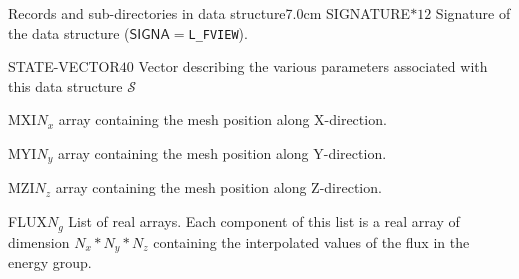 \begin{DescriptionEnregistrement}{Records and sub-directories
 in  data structure}{7.0cm}
\CharEnr
 {SIGNATURE}{$*12$}
 {Signature of the  data structure ($\mathsf{SIGNA}=${\tt L\_FVIEW}).}


\IntEnr
  {STATE-VECTOR}{$40$}
  {Vector describing the various parameters associated with this data structure
  $\mathcal{S}$}

\RealEnr
  {MXI}{$N_{x}$}{}
  {array containing the mesh position along X-direction.}

\RealEnr
  {MYI}{$N_{y}$}{}
  {array containing the mesh position along Y-direction.}

\RealEnr
  {MZI}{$N_{z}$}{}
  {array containing the mesh position along Z-direction.}

\DirlEnr
  {FLUX}{$N_{g}$}
  {List of real arrays. Each component of this list is a real array of dimension $N_{x}*N_{y}*N_{z}$ containing
   the interpolated values of the flux in the energy group.}

\end{DescriptionEnregistrement}
